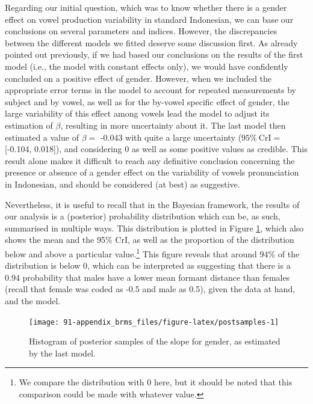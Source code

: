 \documentclass[a4paper,12pt,twoside,onecolumn,openright,final,oldfontcommands]{memoir}
\let\rmarkdownfootnote\footnote%
\def\footnote{\protect\rmarkdownfootnote}
\begin{document}
Regarding our initial question, which was to know whether there is a gender effect on vowel production variability in standard Indonesian, we can base our conclusions on several parameters and indices. However, the discrepancies between the different models we fitted deserve some discussion first. As already pointed out previously, if we had based our conclusions on the results of the first model (i.e., the model with constant effects only), we would have confidently concluded on a positive effect of gender. However, when we included the appropriate error terms in the model to account for repeated measurements by subject and by vowel, as well as for the by-vowel specific effect of gender, the large variability of this effect among vowels lead the model to adjust its estimation of \(\beta\), resulting in more uncertainty about it. The last model then estimated a value of \(\beta =\) -0.043 with quite a large uncertainty (\(95 \% \ \text{CrI} =\) {[}-0.104, 0.018{]}), and considering \(0\) as well as some positive values as credible. This result alone makes it difficult to reach any definitive conclusion concerning the presence or absence of a gender effect on the variability of vowels pronunciation in Indonesian, and should be considered (at best) as suggestive.

Nevertheless, it is useful to recall that in the Bayesian framework, the results of our analysis is a (posterior) probability distribution which can be, as such, summarised in multiple ways. This distribution is plotted in Figure \ref{fig:postsamples}, which also shows the mean and the 95\% CrI, as well as the proportion of the distribution below and above a particular value.\footnote{We compare the distribution with \(0\) here, but it should be noted that this comparison could be made with whatever value.} This figure reveals that around \(94\%\) of the distribution is below \(0\), which can be interpreted as suggesting that there is a \(0.94\) probability that males have a lower mean formant distance than females (recall that female was coded as -0.5 and male as 0.5), given the data at hand, and the model.

\begin{figure}[H]

{\centering \texttt{[image: 91-appendix\_brms\_files/figure-latex/postsamples-1]} 

}

\caption{Histogram of posterior samples of the slope for gender, as estimated by the last model.}\label{fig:postsamples}
\end{figure}
\end{document}
